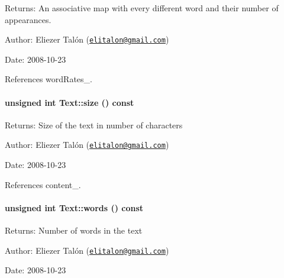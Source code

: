 \begin{Desc}
\item[Returns:]An associative map with every different word and their number of appearances.\end{Desc}
\begin{Desc}
\item[Author:]Eliezer Talón (\href{mailto:elitalon@gmail.com}{\tt elitalon@gmail.com}) \end{Desc}
\begin{Desc}
\item[Date:]2008-10-23 \end{Desc}


References wordRates\_\-.\hypertarget{class_text_b66729ba84c2698ed888f641b3838a8b}{
\paragraph[size]{\setlength{\rightskip}{0pt plus 5cm}unsigned int Text::size () const}\hfill}
\label{class_text_b66729ba84c2698ed888f641b3838a8b}


\begin{Desc}
\item[Returns:]Size of the text in number of characters\end{Desc}
\begin{Desc}
\item[Author:]Eliezer Talón (\href{mailto:elitalon@gmail.com}{\tt elitalon@gmail.com}) \end{Desc}
\begin{Desc}
\item[Date:]2008-10-23 \end{Desc}


References content\_\-.\hypertarget{class_text_edfd71af7802a2d72eed7365f081a66d}{
\paragraph[words]{\setlength{\rightskip}{0pt plus 5cm}unsigned int Text::words () const}\hfill}
\label{class_text_edfd71af7802a2d72eed7365f081a66d}


\begin{Desc}
\item[Returns:]Number of words in the text\end{Desc}
\begin{Desc}
\item[Author:]Eliezer Talón (\href{mailto:elitalon@gmail.com}{\tt elitalon@gmail.com}) \end{Desc}
\begin{Desc}
\item[Date:]2008-10-23 \end{Desc}


